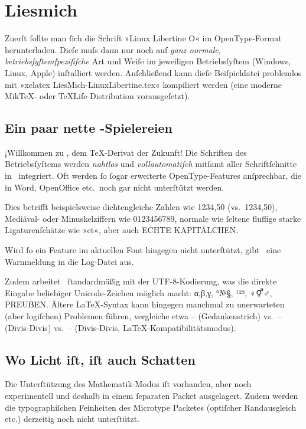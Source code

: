 ﻿\documentclass{scrartcl}
\begin{document}
\section*{Liesmich}
Zuerſt ſollte man ſich die Schrift »Linux Libertine O« im OpenType-Format herunterladen. Dieſe muſs dann nur noch auf \emph{ganz normale, betriebsſyſtemſpezifiſche} Art und Weiſe im jeweiligen Betriebsſyſtem (Windows, Linux, Apple) inſtalliert werden. Anſchließend kann dieſe Beiſpieldatei problemlos mit »xelatex LiesMich-LinuxLibertine.tex« kompiliert werden (eine moderne Mik\TeX- oder \TeX Life-Distribution vorausgeſetzt).


\subsection*{Ein paar nette \XeLaTeX-Spielereien}
¡Willkommen zu \XeLaTeX, dem \TeX-Derivat der Zukunft! Die Schriften des Betriebsſyſtems werden \emph{nahtlos} und \emph{vollautomatiſch} mitſamt aller Schriftſchnitte in \XeTeX\ integriert. Oft werden ſo ſogar erweiterte OpenType-Features anſprechbar, die in Word, OpenOffice etc.\ noch gar nicht unterſtützt werden.

Dies betrifft beispielsweise dichtengleiche Zahlen wie {1234,50} (vs.\ 1234,50), Mediäval- oder Minuskelziffern wie {0123456789}, normale wie ſeltene {fluffige starke Ligaturenſchätze wie »ct«}, aber auch {ECHTE KAPITÄLCHEN}.


Wird ſo ein Feature im aktuellen Font hingegen nicht unterſtützt, gibt \XeTeX\ eine Warnmeldung in die Log-Datei aus.

Zudem arbeitet \XeLaTeX\ ſtandardmäßig mit der UTF-8-Kodierung, was die direkte Eingabe beliebiger Unicode-Zeichen möglich macht: α,β,γ, °№§, ¹²³, ♀⚥♂, PREUẞEN. Ältere \LaTeX-Syntax kann hingegen manchmal zu unerwarteten (aber logiſchen) Problemen führen, vergleiche etwa – (Gedankenstrich) vs.\ -- (Divis-Divis) vs.\ {-- (Divis-Divis, \LaTeX-Kompatibilitätsmodus)}.


\subsection*{Wo Licht iſt, iſt auch Schatten}
Die Unterſtützung des Mathematik-Modus iſt vorhanden, aber noch experimentell und deshalb in einem ſeparaten Packet ausgelagert. Zudem werden die typographiſchen Feinheiten des Microtype Packetes (optiſcher Randausgleich etc.) derzeitig noch nicht unterſtützt.
\end{document}
